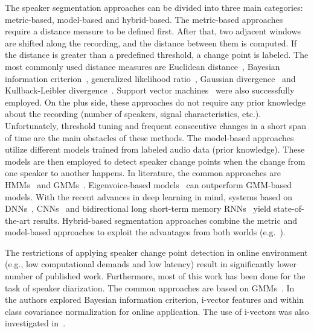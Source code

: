 \documentclass[FM,noheader,EN,bwtitles]{tulthesis}
\begin{document}
The speaker segmentation approaches can be divided into three main categories: metric-based, model-based and hybrid-based.
The metric-based approaches require a distance measure to be defined first.
After that, two adjacent windows are shifted along the recording, and the distance between them is computed.
If the distance is greater than a predefined threshold, a change point is labeled.
The most commonly used distance measures are Euclidean distance~\parencite{DBLP:conf/mm/LuZ02}, Bayesian information criterion~\parencite{Chen98speaker, DBLP:journals/csl/CettoloVR05}, generalized likelihood ratio~\parencite{150477}, Gaussian divergence~\parencite{DBLP:journals/taslp/BarrasZMG06} and Kullback-Leibler divergence~\parencite{Siegler97automaticsegmentation}.
Support vector machines~\parencite{DBLP:journals/speech/FerganiDH08} were also successfully employed.
On the plus side, these approaches do not require any prior knowledge about the recording (number of speakers, signal characteristics, etc.).
Unfortunately, threshold tuning and frequent consecutive changes in a short span of time are the main obstacles of these methods.
The model-based approaches utilize different models trained from labeled audio data (prior knowledge).
These models are then employed to detect speaker change points when the change from one speaker to another happens.
In literature, the common approaches are HMMs~\parencite{DBLP:conf/odyssey/MeignierBI01} and GMMs~\parencite{DBLP:conf/icassp/Magrin-ChagnolleauRP99, DBLP:journals/taslp/MalegaonkarAS07}.
Eigenvoice-based models~\parencite{DBLP:conf/icassp/CastaldoCDLV08, DBLP:conf/interspeech/DesplanquesDM15} can outperform GMM-based models.
With the recent advances in deep learning in mind, systems based on DNNs~\parencite{DBLP:conf/icassp/Gupta15}, CNNs~\parencite{DBLP:conf/icassp/HruzZ17} and bidirectional long short-term memory RNNs~\parencite{Yin2017} yield state-of-the-art results.
Hybrid-based segmentation approaches combine the metric and model-based approaches to exploit the advantages from both worlds (e.g.~\parencite{DBLP:conf/icassp/MoraruMFBB04}).

The restrictions of applying speaker change point detection in online environment (e.g., low computational demands and low latency) result in significantly lower number of published work.
Furthermore, most of this work has been done for the task of speaker diarization.
The common approaches are based on GMMs~\parencite{4430197, DBLP:conf/interspeech/GeigerWR10, DBLP:conf/eusipco/SoldiBE15}.
In~\parencite{Dimitriadis2017} the authors explored Bayesian information criterion, i-vector features and within class covariance normalization for online application.
The use of i-vectors was also investigated in~\parencite{DBLP:conf/icassp/ZhuP16}.
\end{document}
